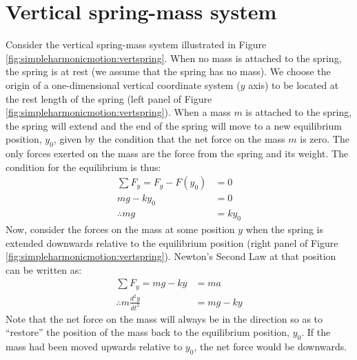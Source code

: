 \section{Vertical spring-mass system}
Consider the vertical spring-mass system illustrated in Figure \ref{fig:simpleharmonicmotion:vertspring}.
When no mass is attached to the spring, the spring is at rest (we assume that the spring has no mass). We choose the origin of a one-dimensional vertical coordinate system ($y$ axis) to be located at the rest length of the spring (left panel of Figure \ref{fig:simpleharmonicmotion:vertspring}). When a mass $m$ is attached to the spring, the spring will extend  and the end of the spring will move to a new equilibrium position, $y_0$, given by the condition that the net force on the mass $m$ is zero. The only forces exerted on the mass are the force from the spring and its weight. The condition for the equilibrium is thus:
\begin{align*}
\sum F_y = F_g - F(y_0) &=0\\
 mg - ky_0 &= 0 \\
 \therefore mg &= ky_0
\end{align*}
Now, consider the forces on the mass at some position $y$ when the spring is extended downwards relative to the equilibrium position (right panel of Figure \ref{fig:simpleharmonicmotion:vertspring}). Newton's Second Law at that position can be written as:
\begin{align*}
\sum F_y = mg - ky &= ma\\
\therefore m \frac{d^2y}{dt^2}& = mg - ky 
\end{align*}
Note that the net force on the mass will always be in the direction so as to ``restore'' the position of the mass back to the equilibrium position, $y_0$. If the mass had been moved upwards relative to $y_0$, the net force would be downwards.


